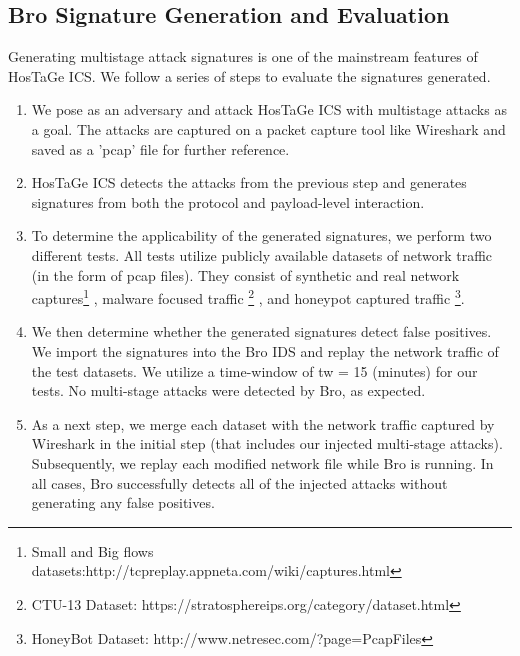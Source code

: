 \documentclass[article,msc=informatik,type=msc,colorback,accentcolor=tud9c]{tudthesis}
\begin{document}
	
	\subsection{Bro Signature Generation and Evaluation}\label{Bro Signature Generation and Evaluation}
	
		Generating multistage attack signatures is one of the mainstream features of HosTaGe ICS. We follow a series of steps to evaluate the signatures generated.
		
		
	 	
	 	\begin{enumerate}
	 	
	 	\item We pose as an adversary and attack HosTaGe ICS with multistage attacks as a goal. The attacks are captured on a packet capture tool like Wireshark and saved as a 'pcap' file for further reference.
	 	
	 	\item HosTaGe ICS detects the attacks from the previous step and generates signatures from both the protocol and payload-level interaction.
	 	
	 	
	 	\item To determine the applicability of the generated signatures, we perform two different tests. All tests utilize publicly available datasets of network traffic (in the form of pcap files). They consist of synthetic and real network captures\footnote{Small and Big flows datasets:http://tcpreplay.appneta.com/wiki/captures.html}  , malware focused traffic \footnote{CTU-13 Dataset: https://stratosphereips.org/category/dataset.html} , and honeypot captured traffic \footnote{HoneyBot Dataset: http://www.netresec.com/?page=PcapFiles}.
	 	
	 	\item We then determine whether the generated signatures detect false positives. We import the signatures into the Bro IDS and replay the network traffic of the test datasets. We utilize a time-window of tw = 15 (minutes) for our tests. No multi-stage attacks were detected by Bro, as expected.
	 	
	 	\item As a next step, we merge each dataset with the network traffic captured by Wireshark in the initial step (that includes our injected multi-stage attacks). Subsequently, we replay each modified network file while Bro is running. In all cases, Bro successfully
	 	detects all of the injected attacks without generating any false positives.
	\end{enumerate}
	
\end{document}
